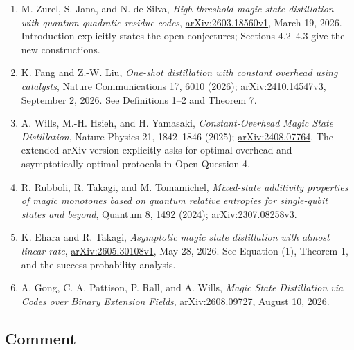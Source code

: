 \begin{enumerate}[label={},leftmargin=4.8em,labelsep=0.5em]
  \footnotesize
  \item[\textup{[Zurel26]}]\label{ref:ae96-zurel26}
  M. Zurel, S. Jana, and N. de Silva, \emph{High-threshold magic state distillation with quantum quadratic residue codes}, \href{https://arxiv.org/html/2603.18560v1}{arXiv:2603.18560v1}, March 19, 2026. Introduction explicitly states the open conjectures; Sections 4.2–4.3 give the new constructions.

  \item[\textup{[Fang26]}]\label{ref:ae96-fang26}
  K. Fang and Z.-W. Liu, \emph{One-shot distillation with constant overhead using catalysts}, Nature Communications 17, 6010 (2026); \href{https://arxiv.org/html/2410.14547v3}{arXiv:2410.14547v3}, September 2, 2026. See Definitions 1–2 and Theorem 7.

  \item[\textup{[Wills25]}]\label{ref:ae96-wills25}
  A. Wills, M.-H. Hsieh, and H. Yamasaki, \emph{Constant-Overhead Magic State Distillation}, Nature Physics 21, 1842–1846 (2025); \href{https://arxiv.org/html/2408.07764v2}{arXiv:2408.07764}. The extended arXiv version explicitly asks for optimal overhead and asymptotically optimal protocols in Open Question 4.

  \item[\textup{[Rubboli24]}]\label{ref:ae96-rubboli24}
  R. Rubboli, R. Takagi, and M. Tomamichel, \emph{Mixed-state additivity properties of magic monotones based on quantum relative entropies for single-qubit states and beyond}, Quantum 8, 1492 (2024); \href{https://arxiv.org/html/2307.08258v3}{arXiv:2307.08258v3}.

  \item[\textup{[Ehara26]}]\label{ref:ae96-ehara26}
  K. Ehara and R. Takagi, \emph{Asymptotic magic state distillation with almost linear rate}, \href{https://arxiv.org/html/2605.30108v1}{arXiv:2605.30108v1}, May 28, 2026. See Equation (1), Theorem 1, and the success-probability analysis.

  \item[\textup{[Gong26]}]\label{ref:ae96-gong26}
  A. Gong, C. A. Pattison, P. Rall, and A. Wills, \emph{Magic State Distillation via Codes over Binary Extension Fields}, \href{https://arxiv.org/abs/2608.09727}{arXiv:2608.09727}, August 10, 2026.
\end{enumerate}

\subsection*{Comment}

